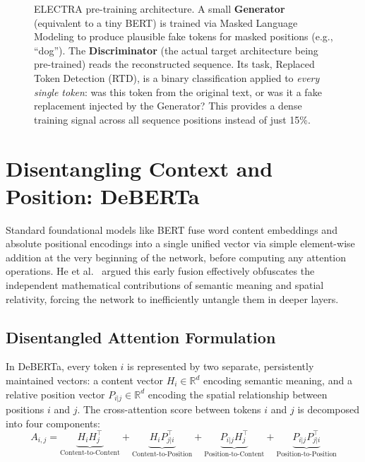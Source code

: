 \documentclass[11pt]{article}
\begin{document}
\begin{figure}[ht]
\begin{tikzpicture}
\end{tikzpicture}
\caption{ELECTRA pre-training architecture. A small \textbf{Generator} (equivalent to a tiny BERT) is trained via Masked Language Modeling to produce plausible fake tokens for masked positions (e.g., ``dog''). The \textbf{Discriminator} (the actual target architecture being pre-trained) reads the reconstructed sequence. Its task, Replaced Token Detection (RTD), is a binary classification applied to \emph{every single token}: was this token from the original text, or was it a fake replacement injected by the Generator? This provides a dense training signal across all sequence positions instead of just 15\%.}
\label{fig:electra_arch}
\end{figure}

\section{Disentangling Context and Position: DeBERTa}
\label{sec:deberta}

Standard foundational models like BERT fuse word content embeddings and absolute positional encodings into a single unified vector via simple element-wise addition at the very beginning of the network, before computing any attention operations. He et al.~\cite{he2020deberta} argued this early fusion effectively obfuscates the independent mathematical contributions of semantic meaning and spatial relativity, forcing the network to inefficiently untangle them in deeper layers.

\subsection{Disentangled Attention Formulation}

In DeBERTa, every token $i$ is represented by two separate, persistently maintained vectors: a content vector $H_i \in \mathbb{R}^d$ encoding semantic meaning, and a relative position vector $P_{i|j} \in \mathbb{R}^d$ encoding the spatial relationship between positions $i$ and $j$. The cross-attention score between tokens $i$ and $j$ is decomposed into four components:
\begin{equation}
  A_{i,j} = \underbrace{H_i H_j^\top}_{\text{Content-to-Content}} + \underbrace{H_i P_{j|i}^\top}_{\text{Content-to-Position}} + \underbrace{P_{i|j} H_j^\top}_{\text{Position-to-Content}} + \underbrace{P_{i|j} P_{j|i}^\top}_{\text{Position-to-Position}}
  \label{eq:deberta_full}
\end{equation}
\end{document}
